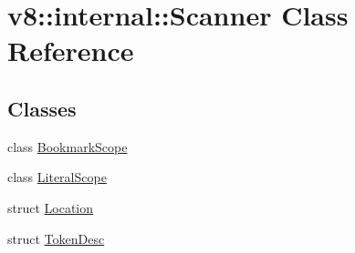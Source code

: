 \hypertarget{classv8_1_1internal_1_1_scanner}{}\section{v8\+:\+:internal\+:\+:Scanner Class Reference}
\label{classv8_1_1internal_1_1_scanner}
\subsection*{Classes}
\begin{DoxyCompactItemize}
\item 
class \hyperlink{classv8_1_1internal_1_1_scanner_1_1_bookmark_scope}{Bookmark\+Scope}
\item 
class \hyperlink{classv8_1_1internal_1_1_scanner_1_1_literal_scope}{Literal\+Scope}
\item 
struct \hyperlink{structv8_1_1internal_1_1_scanner_1_1_location}{Location}
\item 
struct \hyperlink{structv8_1_1internal_1_1_scanner_1_1_token_desc}{Token\+Desc}
\end{DoxyCompactItemize}
